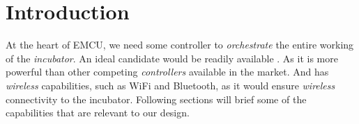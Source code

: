 \documentclass[../../main]{subfiles}
\begin{document}
\section{Introduction} \label{sec:}

At the heart of EMCU, we need some controller to \emph{orchestrate} the entire
working of the \emph{incubator}. An ideal candidate would be readily available
\esp. As it is more powerful than other competing \emph{controllers} available
in the market. And has \emph{wireless} capabilities, such as WiFi and Bluetooth,
as it would ensure \emph{wireless} connectivity to the incubator. Following
sections will brief some of the capabilities that are relevant to our design.

\end{document}
